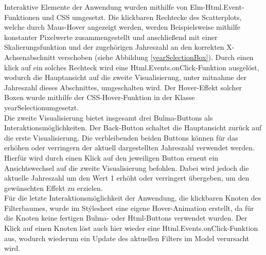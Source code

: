\documentclass[usegeometry=true]{scrartcl}
\begin{document}
Interaktive Elemente der Anwendung wurden mithilfe von Elm-Html.Event-Funktionen und CSS umgesetzt. Die klickbaren Rechtecke des Scatterplots, welche durch Maus-Hover angezeigt werden, werden Beispielsweise mithilfe konstanter Pixelwerte zusammengestellt und anschließend mit einer Skalierungsfunktion und der zugehörigen Jahreszahl an den korrekten X-Achsenabschnitt verschoben (siehe Abbildung \ref{yearSelectionBox}). Durch einen klick auf ein solches Rechteck wird eine Html.Events.onClick-Funktion ausgelöst, wodurch die Hauptansicht auf die zweite Visualisierung, unter mitnahme der Jahreszahl dieses Abschnittes, umgeschalten wird. Der Hover-Effekt solcher Boxen wurde mithilfe der CSS-Hover-Funktion in der Klasse \glqq yearSelection\grqq umgesetzt.\\ Die zweite Visualisierung bietet insgesamt drei Bulma-Buttons als Interaktionsmöglichkeiten. Der \glqq Back\grqq-Button schaltet die Hauptansicht zurück auf die erste Visualisierung. Die verbleibenden beiden Buttons können für das erhöhen oder verringern der aktuell dargestellten Jahreszahl verwendet werden. Hierfür wird durch einen Klick auf den jeweiligen Button erneut ein Ansichtswechsel auf die zweite Visualisierung befohlen. Dabei wird jedoch die aktuelle Jahreszahl um den Wert 1 erhöht oder verringert übergeben, um den gewünschten Effekt zu erzielen.\\ Für die letzte Interaktionsmöglichkeit der Anwendung, die klickbaren Knoten des Filterbaumes, wurde im Stýlesheet eine eigene Hover-Animation erstellt, da für die Knoten keine fertigen Bulma- oder Html-Buttons verwendet wurden. Der Klick auf einen Knoten löst auch hier wieder eine Html.Events.onClick-Funktion aus, wodurch wiederum ein Update des aktuellen Filters im Model verursacht wird.\\
\end{document}
